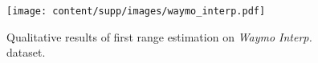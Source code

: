 \begin{figure}[t]
\centering
\texttt{[image: content/supp/images/waymo\_interp.pdf]}

\caption{Qualitative results of first range estimation on \textit{Waymo Interp.} dataset.}
\label{fig:supp_waymo_interp}

\end{figure}